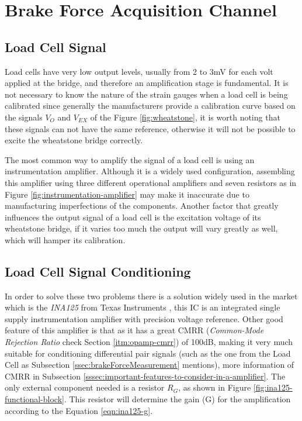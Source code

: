 \section{Brake Force Acquisition Channel}\label{sec:brake-pressure-acquisition-channel}

\subsection{Load Cell Signal}\label{ssec:load-cell-signal}

	Load cells have very low output levels, usually from 2 to 3mV for each volt applied at the bridge, and therefore an amplification stage is fundamental. It is not necessary to know the nature of the strain gauges when a load cell is being calibrated since generally the manufacturers provide a calibration curve based on the signals $V_{O}$ and $V_{EX}$ of the Figure \ref{fig:wheatstone}, it is worth noting that these signals can not have the same reference, otherwise it will not be possible to excite the wheatstone bridge correctly.
	\par
	The most common way to amplify the signal of a load cell is using an instrumentation amplifier. Although it is a widely used configuration, assembling this amplifier using three different operational amplifiers and seven resistors as in Figure \ref{fig:instrumentation-amplifier} may make it inaccurate due to manufacturing imperfections of the components. Another factor that greatly influences the output signal of a load cell is the excitation voltage of its wheatstone bridge, if it varies too much the output will vary greatly as well, which will hamper its calibration.

\subsection{Load Cell Signal Conditioning}\label{ssec:load-cell-signal-conditioning}
		
	In order to solve these two problems there is a solution widely used in the market which is the \textit{INA125} from Texas Instruments \cite{ina125}, this IC is an integrated single supply instrumentation amplifier with precision voltage reference. Other good feature of this amplifier is that as it has a great CMRR (\textit{Common-Mode Rejection Ratio} check Section \ref{itm:opamp-cmrr}) of 100dB, making it very much suitable for conditioning differential pair signals (such as the one from the Load Cell as Subsection \ref{ssec:brakeForceMeasurement} mentions), more information of CMRR in Subsection \ref{sssec:important-features-to-consider-in-a-amplifier}. The only external component needed is a resistor $R_{G}$, as shown in Figure \ref{fig:ina125-functional-block}. This resistor will determine the gain (G) for the amplification according to the Equation \ref{eqn:ina125-g}.
	


